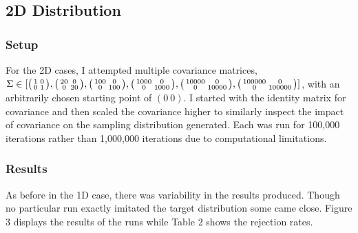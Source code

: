 \documentclass{article} %
\begin{document}
\subsection{2D Distribution}

\subsubsection{Setup}

For the 2D cases, I attempted multiple covariance matrices, \(\Sigma \in [
\bigl(\begin{smallmatrix} 1&0\\0&1 \end{smallmatrix} \bigr), \bigl(\begin{smallmatrix} 20&0\\0&20 \end{smallmatrix} \bigr), \bigl(\begin{smallmatrix} 100&0\\0&100 \end{smallmatrix} \bigr), \bigl(\begin{smallmatrix} 1000&0\\0&1000 \end{smallmatrix} \bigr), \\ \bigl(\begin{smallmatrix} 10000&0\\0&10000 \end{smallmatrix} \bigr),
\bigl(\begin{smallmatrix} 100000&0\\0&100000 \end{smallmatrix} \bigr) ]\), with an arbitrarily chosen starting point of \((0\ 0)\). I started with the identity matrix for covariance and then scaled the covariance higher to similarly inspect the impact of covariance on the sampling distribution generated. Each was run for 100,000 iterations rather than 1,000,000 iterations due to computational limitations.

\subsubsection{Results}

As before in the 1D case, there was variability in the results produced. Though no particular run exactly imitated the target distribution some came close. Figure 3 displays the results of the runs while Table 2 shows the rejection rates.
\end{document}
